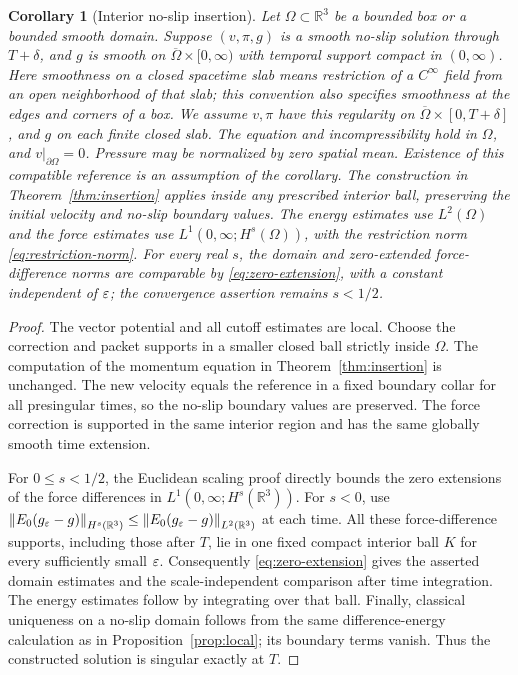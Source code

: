 \documentclass[11pt,a4paper]{article}
\newtheorem{corollary}[theorem]{Corollary}
\theoremstyle{definition}\newtheorem{definition}[theorem]{Definition}
\theoremstyle{remark}\newtheorem{remark}[theorem]{Remark}
\newcommand{\R}{\mathbb R}\newcommand{\TT}{\mathbb T^3}
\newcommand{\norm}[1]{\left\lVert#1\right\rVert}
\begin{document}
\begin{corollary}[Interior no-slip insertion]\label{cor:boundary}
Let $\Omega\subset\R^3$ be a bounded box or a bounded smooth domain. Suppose
$(v,\pi,g)$ is a smooth no-slip solution through $T+\delta$, and $g$ is smooth on $\overline\Omega\times[0,\infty)$ with temporal support compact in $(0,\infty)$.
Here smoothness on a closed spacetime slab means restriction of a
$C^\infty$ field from an open neighborhood of that slab; this convention
also specifies smoothness at the edges and corners of a box. We assume
$v,\pi$ have this regularity on
$\overline\Omega\times[0,T+\delta]$, and $g$ on each finite closed slab.
The equation and incompressibility hold in $\Omega$, and
$v|_{\partial\Omega}=0$. Pressure may be normalized by zero spatial mean.
Existence of this compatible reference is an assumption of the corollary.
The construction in Theorem~\ref{thm:insertion} applies inside any prescribed interior ball, preserving the initial velocity and no-slip boundary values.
The energy estimates use $L^2(\Omega)$ and the force estimates use
$L^1(0,\infty;H^s(\Omega))$, with the restriction norm
\eqref{eq:restriction-norm}. For every real $s$, the domain and zero-extended
force-difference norms are comparable by \eqref{eq:zero-extension}, with a
constant independent of $\varepsilon$; the convergence assertion remains $s<1/2$.
\end{corollary}
\begin{proof}
The vector potential and all cutoff estimates are local. Choose the correction and packet supports in a smaller closed ball strictly inside $\Omega$.
The computation of the momentum equation in Theorem~\ref{thm:insertion} is unchanged. The new velocity equals the reference in a fixed boundary collar for all presingular times, so the no-slip boundary values are preserved. The force correction is supported in the same interior region and has the same globally smooth time extension.

For $0\le s<1/2$, the Euclidean scaling proof directly bounds the zero
extensions of the force differences in $L^1(0,\infty;H^s(\R^3))$.
For $s<0$, use $\norm{E_0(g_\eps-g)}_{H^s(\R^3)}
\le\norm{E_0(g_\eps-g)}_{L^2(\R^3)}$ at each time.
All these force-difference supports, including those after $T$, lie in one
fixed compact interior ball $K$ for every sufficiently small $\varepsilon$.
Consequently \eqref{eq:zero-extension} gives the asserted domain estimates
and the scale-independent comparison after time integration. The energy estimates follow by integrating over that ball. Finally, classical uniqueness on a no-slip domain follows from the same difference-energy calculation as in Proposition~\ref{prop:local}; its boundary terms vanish. Thus the constructed solution is singular exactly at $T$.
\end{proof}
\end{document}
